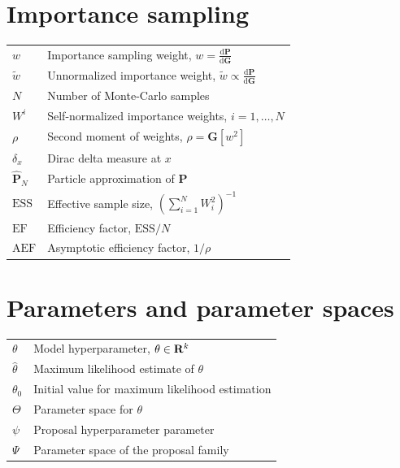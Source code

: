 \section*{Importance sampling}
\noindent
\begin{tabular}{@{} p{\symcolwidth} p{\dimexpr\linewidth-\symcolwidth-2\tabcolsep\relax} @{}}
$w$                 & Importance sampling weight, $w = \frac{\mathrm d\mathbf{P}}{\mathrm d\mathbf{G}}$ \\
$\tilde w$          & Unnormalized importance weight, $\tilde w \propto \frac{\mathrm d\mathbf{P}}{\mathrm d\mathbf{G}}$  \\
$N$                 & Number of Monte-Carlo samples \\
$W^{i}$             & Self-normalized importance weights, $i=1,\dots, N$ \\
$\rho$              & Second moment of weights, $\rho = \mathbf{G}[w^{2}]$ \\
$\delta_x$          & Dirac delta measure at $x$ \\
$\hat{\mathbf P}_N$ & Particle approximation of $\mathbf{P}$ \\
$\mathrm{ESS}$      & Effective sample size, $\left(\sum_{i = 1}^N W_i^{2}\right) ^{-1}$ \\
$\mathrm{EF}$       & Efficiency factor, $\mathrm{ESS} / N$ \\
$\mathrm{AEF}$      & Asymptotic efficiency factor, $1 / \rho$ \\
\end{tabular}

\section*{Parameters and parameter spaces}
\noindent
\begin{tabular}{@{} p{\symcolwidth} p{\dimexpr\linewidth-\symcolwidth-2\tabcolsep\relax} @{}}
$\theta$       & Model hyperparameter, $\theta \in \mathbf R^{k}$ \\
$\hat{\theta}$ & Maximum likelihood estimate of $\theta$ \\
$\theta_{0}$       & Initial value for maximum likelihood estimation \\
$\Theta$       & Parameter space for $\theta$ \\
$\psi$         & Proposal hyperparameter parameter \\
$\Psi$         & Parameter space of the proposal family \\
\end{tabular}

